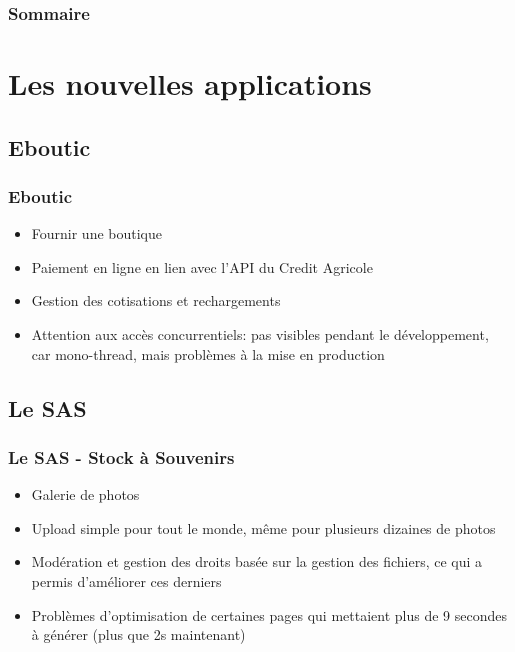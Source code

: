 \documentclass[10pt]{beamer}
\begin{document}

\begin{frame}
    \frametitle{Sommaire}
    \tableofcontents
\end{frame}

\section{Les nouvelles applications}
\subsection{Eboutic}
\begin{frame}[fragile]\frametitle{Eboutic}
    \begin{itemize}
        \item Fournir une boutique
        \item Paiement en ligne en lien avec l'API du Credit Agricole
        \item Gestion des cotisations et rechargements
        \item Attention aux accès concurrentiels: pas visibles pendant le développement, car mono-thread, mais problèmes
            à la mise en production
    \end{itemize}
\end{frame}

\subsection{Le SAS}
\begin{frame}[fragile]\frametitle{Le SAS - Stock à Souvenirs}
    \begin{itemize}
        \item Galerie de photos
        \item Upload simple pour tout le monde, même pour plusieurs dizaines de photos
        \item Modération et gestion des droits basée sur la gestion des fichiers, ce qui a permis d'améliorer ces
            derniers
        \item Problèmes d'optimisation de certaines pages qui mettaient plus de 9 secondes à générer (plus que 2s
            maintenant)
    \end{itemize}
\end{frame}
\end{document}
